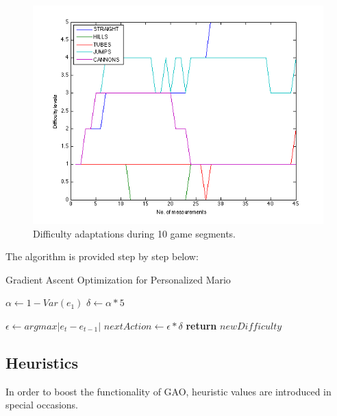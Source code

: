 \documentclass[11pt]{article}
\begin{document}
\begin{figure}
\includegraphics[scale=0.5]{difficulties.png}
\caption{Difficulty adaptations during 10 game segments.}
\label{fig:difficulties10seg}
\end{figure}


The algorithm is provided step by step below: 


\begin{algorithm}
\caption{Gradient Ascent Optimization for Personalized Mario}\label{euclid}
\begin{algorithmic}[1]

   \State $\alpha\gets 1-Var(e_1)$
   \State $\delta \gets \alpha*5$

      \State $\epsilon\gets argmax|e_t-e_{t-1}|$ 
      \State $nextAction\gets\epsilon*\delta$
      \EndIf
      \State \textbf{return} $newDifficulty$
   \EndFor
   
\EndProcedure
\end{algorithmic}
\end{algorithm}

\subsection*{Heuristics}
In order to boost the functionality of GAO, heuristic values are introduced in special occasions. 
\end{document}
